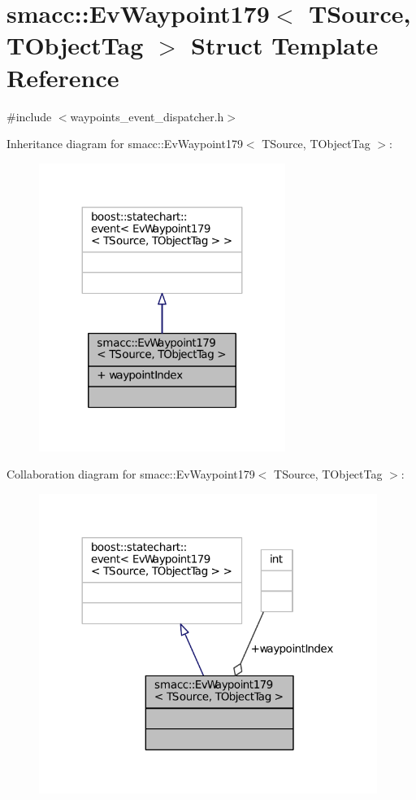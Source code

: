 \hypertarget{structsmacc_1_1EvWaypoint179}{}\section{smacc\+:\+:Ev\+Waypoint179$<$ T\+Source, T\+Object\+Tag $>$ Struct Template Reference}
\label{structsmacc_1_1EvWaypoint179}


{\ttfamily \#include $<$waypoints\+\_\+event\+\_\+dispatcher.\+h$>$}



Inheritance diagram for smacc\+:\+:Ev\+Waypoint179$<$ T\+Source, T\+Object\+Tag $>$\+:
\nopagebreak
\begin{figure}[H]
\begin{center}
\leavevmode
\includegraphics[width=227pt]{structsmacc_1_1EvWaypoint179__inherit__graph}
\end{center}
\end{figure}


Collaboration diagram for smacc\+:\+:Ev\+Waypoint179$<$ T\+Source, T\+Object\+Tag $>$\+:
\nopagebreak
\begin{figure}[H]
\begin{center}
\leavevmode
\includegraphics[width=312pt]{structsmacc_1_1EvWaypoint179__coll__graph}
\end{center}
\end{figure}

